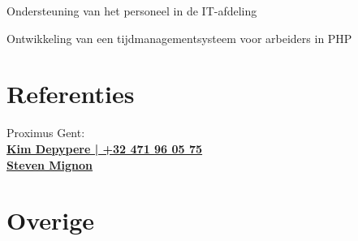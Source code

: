 \documentclass[a4paper]{deedy-resume} %
\begin{document}
\begin{minipage}[t]{0.60\textwidth}

\begin{tightitemize}
\item Ondersteuning van het personeel in de IT-afdeling
\item Ontwikkeling van een tijdmanagementsysteem voor arbeiders in PHP
\end{tightitemize}

\sectionspace %




\sectionspace %


\section{Referenties}
Proximus Gent: \\
\href{https://be.linkedin.com/in/kimdepypere}{\bf Kim Depypere | +32 471 96 05 75}\\
\href{https://www.linkedin.com/in/steven-mignon-79b48629}{\bf Steven Mignon}

\section{Overige} 



\sectionspace %


\end{minipage} %


\end{document}
